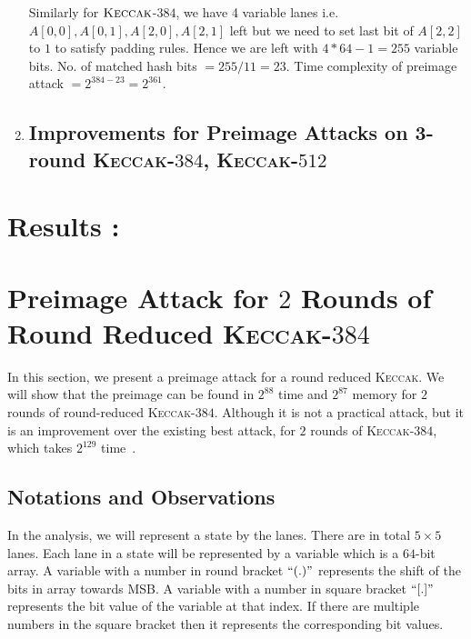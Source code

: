 \documentclass[runningheads]{llncs}
\newcommand{\KECCAK}{\mbox{\textsc{Keccak}}}
\newcommand{\Keccak}{\mbox{\textsc{Keccak}}}
\begin{document}
\begin{enumerate}
		Similarly for $\KECCAK$-$384$, we have 4 variable lanes i.e. $A[0,0], A[0,1], A[2,0], A[2,1]$ left but we need to set last bit of $A[2,2]$ to $1$ to satisfy padding rules. Hence we are left with $4*64 - 1 = 255$ variable bits.
		No. of matched hash bits $ = 255/11 = 23 $. Time complexity of preimage attack $= 2^{384 - 23} = 2^{361}$.

	\item \subsection{Improvements for Preimage Attacks on 3-round \KECCAK-$384$, \KECCAK-$512$}
	
\end{enumerate}


\section{Results :}

\section{Preimage Attack for $2$ Rounds of Round Reduced \KECCAK-$384$}

In this section, we present a preimage attack for a round reduced \KECCAK{}. We will show that the preimage can be found in $2^{88}$ time and $2^{87}$ memory for $2$ rounds of round-reduced \Keccak-$384$. Although it is not a practical attack, but it is an improvement over the existing best attack, for $2$ rounds of \Keccak-$384$, which takes $2^{129}$ time~\cite{guo2016linear}.


\subsection{Notations and Observations}
In the analysis, we will represent a state by the lanes. There are in total $5\times 5$ lanes. Each lane in a state will be represented by a
 variable which is a $64$-bit array. 
A variable with a number in round bracket $``( . )"$ represents the shift of the bits in array towards MSB. A variable with a number in square bracket $``[ . ]"$ represents the bit value of the variable at that index. If there are multiple numbers in the square bracket then it represents the corresponding bit values.

\end{document}
